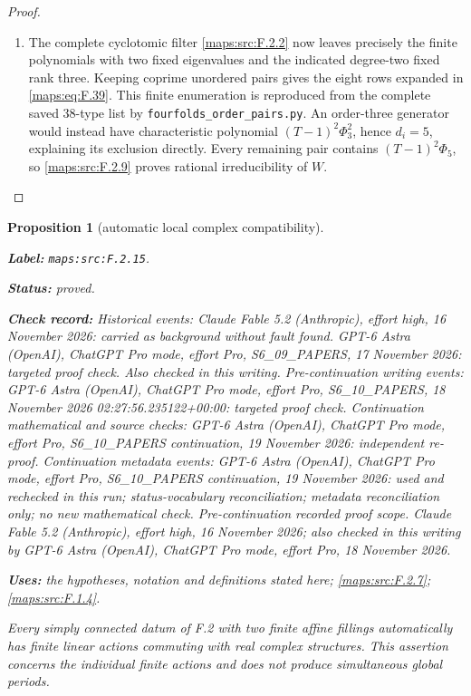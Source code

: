 \documentclass[11pt,a4paper]{article}
\newtheorem{proposition}[proposition]{Proposition}
\theoremstyle{definition}
\newcommand{\StatementRecord}[4]{\par\smallskip\begingroup\upshape\raggedright\noindent\textbf{Label:} \nolinkurl{#1}.\par\noindent\textbf{Status:} #2.\par\noindent\textbf{Check record:} #3.\par\noindent\textbf{Uses:} #4.\par\endgroup\smallskip}
\begin{document}
\begin{proof}
\begin{enumerate}[label=\arabic*.]
\item The complete cyclotomic filter \ref{maps:src:F.2.2} now leaves precisely
the finite polynomials with two fixed eigenvalues and
the indicated degree-two fixed rank three.
Keeping coprime unordered pairs gives the eight rows
expanded in \eqref{maps:eq:F.39}.  This finite enumeration is reproduced
from the complete saved 38-type list by
\texttt{fourfolds\_order\_pairs.py}.
An order-three generator would instead have characteristic
polynomial $(T-1)^2\Phi_3^2$, hence $d_i=5$, explaining
its exclusion directly.
Every remaining pair contains $(T-1)^2\Phi_5$, so \ref{maps:src:F.2.9}
proves rational irreducibility of $W$.

\end{enumerate}
\end{proof}




\begin{proposition}[automatic local complex compatibility]\label{maps:src:F.2.15}
\StatementRecord{maps:src:F.2.15}{proved}{Historical events: Claude Fable 5.2 (Anthropic), effort high, 16 November 2026: carried as background without fault found. GPT-6 Astra (OpenAI), ChatGPT Pro mode, effort Pro, S6\_09\_PAPERS, 17 November 2026: targeted proof check. Also checked in this writing. Pre-continuation writing events: GPT-6 Astra (OpenAI), ChatGPT Pro mode, effort Pro, S6\_10\_PAPERS, 18 November 2026 02:27:56.235122+00:00: targeted proof check. Continuation mathematical and source checks: GPT-6 Astra (OpenAI), ChatGPT Pro mode, effort Pro, S6\_10\_PAPERS continuation, 19 November 2026: independent re-proof. Continuation metadata events: GPT-6 Astra (OpenAI), ChatGPT Pro mode, effort Pro, S6\_10\_PAPERS continuation, 19 November 2026: used and rechecked in this run; status-vocabulary reconciliation; metadata reconciliation only; no new mathematical check. \emph{Pre-continuation recorded proof scope.} Claude Fable 5.2 (Anthropic), effort high, 16 November 2026; also checked in this writing by GPT-6 Astra (OpenAI), ChatGPT Pro mode, effort Pro, 18 November 2026}{the hypotheses, notation and definitions stated here; \cref{maps:src:F.2.7}; \cref{maps:src:F.1.4}}


Every simply connected datum of F.2 with two finite affine
fillings automatically has finite linear actions commuting
with real complex structures.  This assertion concerns the
individual finite actions and does not produce simultaneous
global periods.

\end{proposition}
\end{document}
